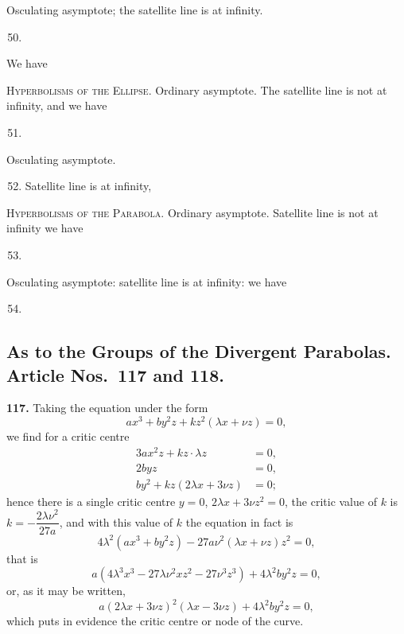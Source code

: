 \documentclass[11pt,a4paper]{article}
\theoremstyle{plain}
\begin{document}
Osculating asymptote; the satellite line is at infinity.
\begin{enumerate}[label=\textsc{\Roman*.},nosep]
\setcounter{enumi}{49}
\item
\end{enumerate}

We have

\textsc{Hyperbolisms of the Ellipse.} Ordinary asymptote. The satellite line is not at infinity, and we have
\begin{enumerate}[label=\textsc{\Roman*.},nosep]
\setcounter{enumi}{50}
\item
\end{enumerate}
Osculating asymptote.
\begin{enumerate}[label=\textsc{\Roman*.},nosep]
\setcounter{enumi}{51}
\item Satellite line is at infinity,
\end{enumerate}

\textsc{Hyperbolisms of the Parabola.} Ordinary asymptote. Satellite line is not at infinity we have
\begin{enumerate}[label=\textsc{\Roman*.},nosep]
\setcounter{enumi}{52}
\item
\end{enumerate}
Osculating asymptote: satellite line is at infinity: we have
\begin{enumerate}[label=\textsc{\Roman*.},nosep]
\setcounter{enumi}{53}
\item
\end{enumerate}

\subsection*{As to the Groups of the Divergent Parabolas. Article Nos.\ 117 and 118.}

\noindent\textbf{117.} Taking the equation under the form
\[
ax^3 + by^2z + kz^2(\lambda x + \nu z) = 0,
\]
we find for a critic centre
\begin{align*}
3ax^2z + kz\cdot\lambda z &= 0,\\
2byz &= 0,\\
by^2 + kz(2\lambda x + 3\nu z) &= 0;
\end{align*}
hence there is a single critic centre $y = 0$, $2\lambda x + 3\nu z^2 = 0$, the critic value of $k$ is $k = -\dfrac{2\lambda\nu^2}{27a}$, and with this value of $k$ the equation in fact is
\[
4\lambda^2(ax^3 + by^2z) - 27a\nu^2(\lambda x + \nu z)z^2 = 0,
\]
that is
\[
a(4\lambda^3x^3 - 27\lambda\nu^2xz^2 - 27\nu^3z^3) + 4\lambda^2by^2z = 0,
\]
or, as it may be written,
\[
a(2\lambda x + 3\nu z)^2(\lambda x - 3\nu z) + 4\lambda^2by^2z = 0,
\]
which puts in evidence the critic centre or node of the curve.
\end{document}
